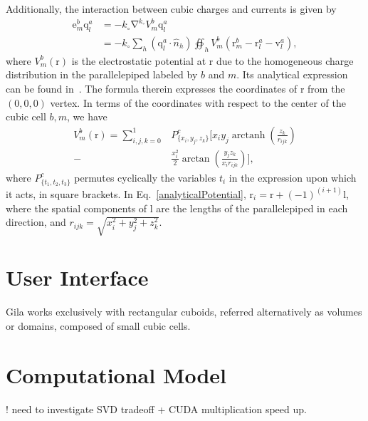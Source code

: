 \documentclass[reprint,aps,prb]{revtex4-2}
\newcommand{\bmm}[1]{\bm{\mathrm{#1}}}
\DeclareMathOperator\arctanh{arctanh}
\begin{document}
Additionally, the interaction between cubic charges and currents is given by
\begin{align}
	\bmm{e}^b_m\bmm{q}^a_{l} &= -k_{\circ}\bmm{\nabla}^{k_\circ}V^b_m \bmm{q}^a_{l} \nonumber\\
	&=-k_\circ \sum_{h}\left(\bmm{q}^a_{l} \cdot\hat{n}_h\right) \oiint_h V^b_m\left(\bmm{r}^b_m-\bmm{r}^a_l-\bmm{v}^a_l \right),
\end{align}
where \(V_m^b(\bmm{r})\) is the electrostatic potential at \(\bmm{r}\) due to the homogeneous charge distribution in the parallelepiped labeled by \(b\) and \(m\). Its analytical expression can be found in~\cite{waldvogel1976the}. The formula therein expresses the coordinates of \(\bmm{r}\) from the \((0,0,0)\) vertex. In terms of the coordinates with respect to the center of the cubic cell \(b,m\), we have
\begin{align}
	V^b_m(\bmm{r}) = \sum_{i,j,k=0}^1& P^c_{\{x_i,y_j,z_k\}}\Bigg[x_i y_j\arctanh\left(\frac{z_k}{r_{ijk}}\right) \nonumber \\
	-& \frac{x_i^2}{2}\arctan\left(\frac{y_j z_k}{x_i r_{ijk}}\right) \Bigg], \label{analyticalPotential}
\end{align}
where \(P^c_{\{t_1,t_2,t_3\}}\) permutes cyclically the variables \(t_i\) in the expression upon which it acts, in square brackets. In Eq.~\eqref{analyticalPotential}, \(\bmm{r}_i=\bmm{r}+(-1)^{(i+1)}\bmm{l}\), where the spatial components of \(\bmm{l}\) are the lengths of the parallelepiped in each direction, and \(r_{ijk}=\sqrt{x_i^2+y_j^2+z_k^2}\).

\section{User Interface} 
Gila works exclusively with rectangular cuboids, referred alternatively as volumes or domains, composed of small cubic cells. 

\section{Computational Model}



! need to investigate SVD tradeoff + CUDA multiplication speed up. 
\end{document}
